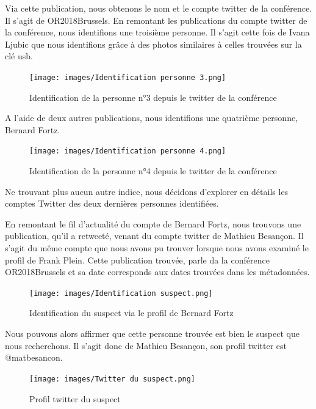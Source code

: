 \documentclass[a4paper]{article}
\begin{document}
Via cette publication, nous obtenons le nom et le compte twitter de la conférence.
Il s’agit de OR2018Brussels.
En remontant les publications du compte twitter de la conférence, nous identifions une troisième personne. 
Il s’agit cette fois de Ivana Ljubic que nous identifions grâce à des photos similaires à celles trouvées sur la clé usb.

\begin{figure}[H]
    \centering
    \texttt{[image: images/Identification personne 3.png]}
    \caption{Identification de la personne n°3 depuis le twitter de la conférence}
    \label{identity_third_person}
\end{figure}

A l’aide de deux autres publications, nous identifions une quatrième personne, Bernard Fortz.

\begin{figure}[H]
    \centering
    \texttt{[image: images/Identification personne 4.png]}
    \caption{Identification de la personne n°4 depuis le twitter de la conférence}
    \label{identity_fourth_person}
\end{figure}

Ne trouvant plus aucun autre indice, nous décidons d’explorer en détails les comptes Twitter des deux dernières personnes identifiées.

En remontant le fil d’actualité du compte de Bernard Fortz, nous trouvons une publication, qu’il a retweeté, venant du compte twitter de Mathieu Besançon. Il s’agit du même compte que nous avons pu trouver lorsque nous avons examiné le profil de Frank Plein. Cette publication trouvée, parle da la conférence OR2018Brussels et sa date corresponds aux dates trouvées dans les métadonnées. 

\begin{figure}[H]
    \centering
    \texttt{[image: images/Identification suspect.png]}
    \caption{Identification du suspect via le profil de Bernard Fortz}
    \label{identity_bernard_fortz}
\end{figure}

Nous pouvons alors affirmer que cette personne trouvée est bien le suspect que nous recherchons.
Il s’agit donc de Mathieu Besançon, son profil twitter est @matbesancon.

\begin{figure}[H]
    \centering
    \texttt{[image: images/Twitter du suspect.png]}
    \caption{Profil twitter du suspect}
    \label{twitter_profile}
\end{figure}
\end{document}
